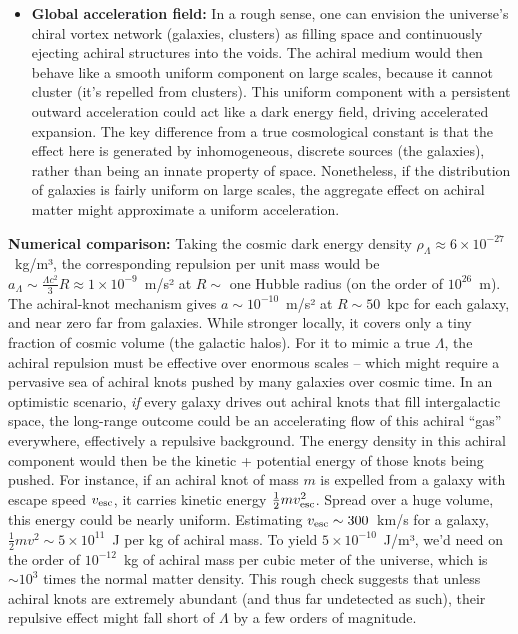 \begin{itemize}
\item
\textbf{Global acceleration field:} In a rough sense, one can envision the universe’s chiral vortex network (galaxies, clusters) as filling space and continuously ejecting achiral structures into the voids. The achiral medium would then behave like a smooth uniform component on large scales, because it cannot cluster (it’s repelled from clusters). This uniform component with a persistent outward acceleration could act like a dark energy field, driving accelerated expansion. The key difference from a true cosmological constant is that the effect here is generated by inhomogeneous, discrete sources (the galaxies), rather than being an innate property of space. Nonetheless, if the distribution of galaxies is fairly uniform on large scales, the aggregate effect on achiral matter might approximate a uniform acceleration.
\end{itemize}

\textbf{Numerical comparison:} Taking the cosmic dark energy density $\rho_\Lambda \approx 6\times10^{-27}$~kg/m³, the corresponding repulsion per unit mass would be $a_\Lambda \sim \frac{\Lambda c^2}{3} R \approx 1\times10^{-9}$~m/s² at $R\sim$ one Hubble radius (on the order of $10^{26}$~m). The achiral-knot mechanism gives $a \sim10^{-10}$~m/s² at $R\sim50$~kpc for each galaxy, and near zero far from galaxies. While stronger locally, it covers only a tiny fraction of cosmic volume (the galactic halos). For it to mimic a true $\Lambda$, the achiral repulsion must be effective over enormous scales – which might require a pervasive sea of achiral knots pushed by many galaxies over cosmic time. In an optimistic scenario, \textit{if} every galaxy drives out achiral knots that fill intergalactic space, the long-range outcome could be an accelerating flow of this achiral “gas” everywhere, effectively a repulsive background. The energy density in this achiral component would then be the kinetic + potential energy of those knots being pushed. For instance, if an achiral knot of mass $m$ is expelled from a galaxy with escape speed $v_{\rm esc}$, it carries kinetic energy $\frac{1}{2}mv_{\rm esc}^2$. Spread over a huge volume, this energy could be nearly uniform. Estimating $v_{\rm esc}\sim 300$~km/s for a galaxy, $\frac{1}{2}m v^2 \sim 5\times10^{11}$~J per kg of achiral mass. To yield $5\times10^{-10}$~J/m³, we’d need on the order of $10^{-12}$~kg of achiral mass per cubic meter of the universe, which is $\sim10^3$ times the normal matter density. This rough check suggests that unless achiral knots are extremely abundant (and thus far undetected as such), their repulsive effect might fall short of $\Lambda$ by a few orders of magnitude.

